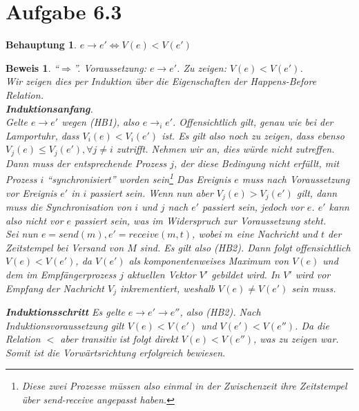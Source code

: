\documentclass[a4paper,
12pt,
BCOR12mm,
]{scrartcl}
\theoremstyle{break}
\newtheorem{beh}{Behauptung}
\newtheorem{bew}{Beweis}
\begin{document}
\section*{Aufgabe 6.3}
\begin{beh}
  $e \rightarrow e' \Leftrightarrow V(e) < V(e')$
\end{beh}
\begin{bew}
  "`$\Rightarrow$"'. Voraussetzung: $e \rightarrow e'$. Zu zeigen: $V(e) < V(e')$. \\
  Wir zeigen dies per Induktion über die Eigenschaften der \emph{Happens-Before
  Relation}. \\
\textbf{Induktionsanfang}. \\

Gelte $e \rightarrow e'$ wegen (HB1), also $e \rightarrow_i e'$. Offensichtlich gilt,
genau wie bei der Lamportuhr, dass $V_i(e) < V_i(e')$ ist. Es gilt also noch zu zeigen,
dass ebenso $V_j(e) \leq V_j(e'), \forall j \neq i$ zutrifft. Nehmen wir an, dies würde
nicht zutreffen. Dann muss der entsprechende Prozess $j$, der diese Bedingung nicht
erfüllt, mit Prozess $i$ "`synchronisiert"' worden sein\footnote{Diese zwei Prozesse
müssen also einmal in der Zwischenzeit ihre Zeitstempel über \emph{send-receive} angepasst
haben.} Das Ereignis $e$ muss nach Voraussetzung vor Ereignis $e'$ in $i$ passiert sein.
Wenn nun aber $V_j(e) > V_j(e')$ gilt, dann muss die Synchronisation von $i$ und $j$
nach $e'$ passiert sein, jedoch vor $e$. $e'$ kann also nicht vor $e$ passiert sein, was
im Widerspruch zur Voraussetzung steht.\\

Sei nun $e = send(m), e' = receive(m,t)$, wobei $m$ eine Nachricht und $t$ der Zeitstempel
bei Versand von $M$ sind. Es gilt also (HB2). Dann folgt offensichtlich $V(e) < V(e')$, da $V(e')$ als
komponentenweises Maximum von $V(e)$ und dem im Empfängerprozess $j$ aktuellen Vektor $V'$
gebildet wird. In $V'$ wird vor Empfang der Nachricht $V_j$ inkrementiert, weshalb $V(e)
\neq V(e')$ sein muss.

\textbf{Induktionsschritt}
Es gelte $e \rightarrow e' \rightarrow e''$, also (HB2). Nach Induktionsvoraussetzung
gilt $V(e) < V(e')$ und $V(e') < V(e'')$. Da die Relation $<$ aber transitiv ist folgt
direkt $V(e) < V(e'')$, was zu zeigen war. \\
Somit ist die Vorwärtsrichtung erfolgreich bewiesen.

\end{bew}
\end{document}
